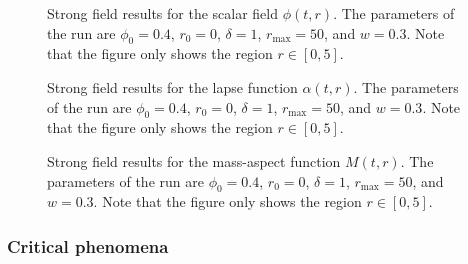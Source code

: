 \documentclass[a4paper,11pt]{article}
\renewcommand{\a}{\alpha}
\begin{document}
\begin{figure}[ht]
  \centering
  
  \caption[New strong field results for the scalar field $\phi(t,r)$.]{Strong field results for the scalar field $\phi(t,r)$. The parameters of the run are $\phi_{0}=0.4$, $r_{0}=0$, $\delta=1$, $r_{\max}=50$, and $w=0.3$. Note that the figure only shows the region $r\in[0,5]$.}
  \label{fig:phi_strong_new}
\end{figure}

\begin{figure}[ht]
  \centering
  
  \caption[New strong field results for the lapse function $\a(t,r)$.]{Strong field results for the lapse function $\a(t,r)$. The parameters of the run are $\phi_{0}=0.4$, $r_{0}=0$, $\delta=1$, $r_{\max}=50$, and $w=0.3$. Note that the figure only shows the region $r\in[0,5]$.}
  \label{fig:alpha_strong_new}
\end{figure}

\begin{figure}[ht]
  \centering
  
  \caption[New strong field results for the mass-aspect function $M(t,r)$.]{Strong field results for the mass-aspect function $M(t,r)$. The parameters of the run are $\phi_{0}=0.4$, $r_{0}=0$, $\delta=1$, $r_{\max}=50$, and $w=0.3$. Note that the figure only shows the region $r\in[0,5]$.}
  \label{fig:mass_strong_new}
\end{figure}

\subsubsection{Critical phenomena}



\clearpage
{}
\printbibliography
\end{document}
